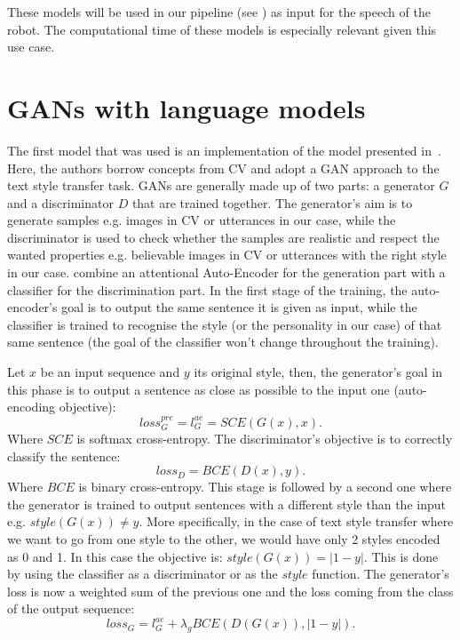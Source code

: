 \documentclass[nomenclature, english, biblatex]{kththesis}
\begin{document}
These models will be used in our pipeline (see ) as input for the speech of the robot. The computational time of these models is especially relevant given this use case.
\section{GANs with language models}
\label{sec:gan_based}
The first model that was used is an implementation of the model presented in~\cite{yang2018unsupervised}. Here, the authors borrow concepts from \gls{CV} and adopt a \gls{GAN} approach to the text style transfer task. \Glspl{GAN} are generally made up of two parts: a generator $G$ and a discriminator $D$ that are trained together. The generator's aim is to generate samples e.g. images in \gls{CV} or utterances in our case, while the discriminator is used to check whether the samples are realistic and respect the wanted properties e.g. believable images in \gls{CV} or utterances with the right style in our case. \textcite{yang2018unsupervised} combine an attentional Auto-Encoder for the generation part with a classifier for the discrimination part. In the first stage of the training, the auto-encoder's goal is to output the same sentence it is given as input, while the classifier is trained to recognise the style (or the personality in our case) of that same sentence (the goal of the classifier won't change throughout the training). 

Let $x$ be an input sequence and $y$ its original style, then, the generator's goal in this phase is to output a sentence as close as possible to the input one (auto-encoding objective):
\begin{equation*}
loss_G^{pre} = l_G^{ae} = SCE(G(x), x).
\end{equation*}
Where $SCE$ is softmax cross-entropy. The discriminator's objective is to correctly classify the sentence:
\begin{equation*}
loss_D = BCE(D(x), y).
\end{equation*} 
Where $BCE$ is binary cross-entropy. This stage is followed by a second one where the generator is trained to output sentences with a different style than the input e.g. $style(G(x)) \neq y$. More specifically, in the case of text style transfer where we want to go from one style to the other, we would have only 2 styles encoded as 0 and 1. In this case the objective is: $style(G(x)) = |1-y|$. This is done by using the classifier as a discriminator or as the $style$ function. The generator's loss is now a weighted sum of the previous one and the loss coming from the class of the output sequence:
\begin{equation*}
loss_G = l_G^{ae} + \lambda_g BCE(D(G(x)), |1 - y|).
\end{equation*}
\end{document}
